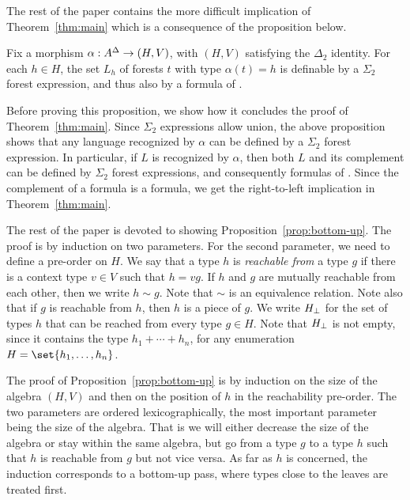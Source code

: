 \documentclass{LMCS}
\begin{document}
The rest of the paper contains the more difficult implication of
Theorem~\ref{thm:main} which is a consequence of the proposition below.

\begin{prop}\label{prop:bottom-up}
  Fix a morphism $\alpha : A^\Delta \to (H,V)$, with $(H,V)$
  satisfying the $\Delta_2$ identity.  For each $h \in H$, the set $L_h$
   of forests $t$ with type $\alpha(t)=h$ is definable by a $\Sigma_2$ forest
  expression, and thus also by a formula of \Stwol.
\end{prop}


Before proving this proposition, we show how it concludes the proof of
Theorem~\ref{thm:main}.  Since $\Sigma_2$ expressions allow union, the
above proposition shows that any language recognized by $\alpha$ can
be defined by a $\Sigma_2$ forest expression. In particular, if $L$ is
recognized by $\alpha$, then both $L$ and its complement can be
defined by $\Sigma_2$ forest expressions, and consequently formulas of
\Stwol.  Since the complement of a \Stwol formula is a \Ptwol
formula, we get the right-to-left implication in
Theorem~\ref{thm:main}.

The rest of the paper is devoted to showing
Proposition~\ref{prop:bottom-up}. The proof is by induction on two
parameters.  For the second parameter, we need to define a pre-order on $H$. We say that a type $h$ is
\emph{reachable from} a type $g$ if there is a context type $v \in V$ such
that $h=vg$. If $h$ and $g$ are mutually reachable from each other,
then we write $h \sim g$. Note that $\sim$ is an equivalence relation.
Note also that if $g$ is reachable from $h$, then $h$ is a piece of
$g$. We write ${H_\bot}$ for the set of types $h$ that can be reached
from every type $g \in H$. Note that ${H_\bot}$ is not empty, since it
contains the type $h_1 + \cdots + h_n$, for any enumeration
$H=\set{h_1,\ldots,h_n}$. 




The proof of Proposition~\ref{prop:bottom-up} is by induction on the
size of the algebra $(H,V)$ and then on the position of $h$ in the
reachability pre-order. The two parameters are ordered
lexicographically, the most important parameter being the size of the
algebra. That is we will either decrease the size of the algebra or
stay within the same algebra, but go from a type $g$ to a type $h$
such that $h$ is reachable from $g$ but not vice versa. As far as $h$
is concerned, the induction corresponds to a bottom-up pass, where
types close to the leaves are treated first.
\end{document}
